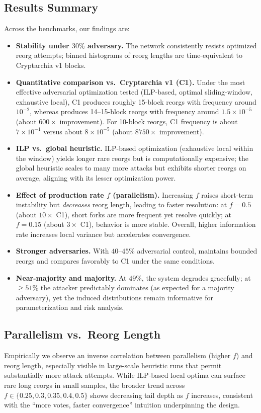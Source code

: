 \subsection{Results Summary}
Across the benchmarks, our findings are:
\begin{itemize}
	\item \textbf{Stability under $30\%$ adversary.} The network consistently resists optimized reorg attempts; binned histograms of reorg lengths are time-equivalent to Cryptarchia v1 blocks.
	\item \textbf{Quantitative comparison vs.\ Cryptarchia v1 (C1).} Under the most effective adversarial optimization tested (ILP-based, optimal sliding-window, exhaustive local), C1 produces roughly 15-block reorgs with frequency around $10^{-2}$, whereas \ProjBase{} produces 14--15-block reorgs with frequency around $1.5\times 10^{-5}$ (about $600\times$ improvement). For 10-block reorgs, C1 frequency is about $7\times 10^{-1}$ versus \ProjBase{} about $8\times 10^{-5}$ (about $8750\times$ improvement).
	\item \textbf{ILP vs.\ global heuristic.} ILP-based optimization (exhaustive local within the window) yields longer rare reorgs but is computationally expensive; the global heuristic scales to many more attacks but exhibits shorter reorgs on average, aligning with its lesser optimization power.
	\item \textbf{Effect of production rate $f$ (parallelism).} Increasing $f$ raises short-term instability but \emph{decreases} reorg length, leading to faster resolution: at $f{=}0.5$ (about $10\times$ C1), short forks are more frequent yet resolve quickly; at $f{=}0.15$ (about $3\times$ C1), behavior is more stable. Overall, higher information rate increases local variance but accelerates convergence.
	\item \textbf{Stronger adversaries.} With $40$--$45\%$ adversarial control, \ProjBase{} maintains bounded reorgs and compares favorably to C1 under the same conditions.
	\item \textbf{Near-majority and majority.} At $49\%$, the system degrades gracefully; at $\ge 51\%$ the attacker predictably dominates (as expected for a majority adversary), yet the induced distributions remain informative for parameterization and risk analysis.
\end{itemize}

\subsection{Parallelism vs.\ Reorg Length}
Empirically we observe an inverse correlation between parallelism (higher $f$) and reorg length, especially visible in large-scale heuristic runs that permit substantially more attack attempts. While ILP-based local optima can surface rare long reorgs in small samples, the broader trend across $f\in\{0.25,0.3,0.35,0.4,0.5\}$ shows decreasing tail depth as $f$ increases, consistent with the “more votes, faster convergence” intuition underpinning the design.

